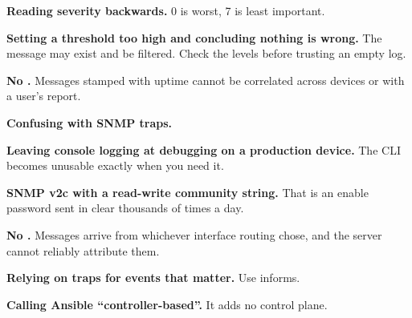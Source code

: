 \begin{pitfall}
\begin{tight}
  \item \textbf{Reading severity backwards.} 0 is worst, 7 is least important.
  \item \textbf{Setting a threshold too high and concluding nothing is wrong.}
        The message may exist and be filtered. Check the levels before trusting
        an empty log.
  \item \textbf{No .} Messages stamped with uptime cannot
        be correlated across devices or with a user's report.
  \item \textbf{Confusing  with SNMP traps.}
  \item \textbf{Leaving console logging at debugging on a production device.} The
        CLI becomes unusable exactly when you need it.
  \item \textbf{SNMP v2c with a read-write community string.} That is an enable
        password sent in clear thousands of times a day.
  \item \textbf{No .} Messages arrive from whichever
        interface routing chose, and the server cannot reliably attribute them.
  \item \textbf{Relying on traps for events that matter.} Use informs.
  \item \textbf{Calling Ansible ``controller-based''.} It adds no control plane.
\end{tight}
\end{pitfall}

